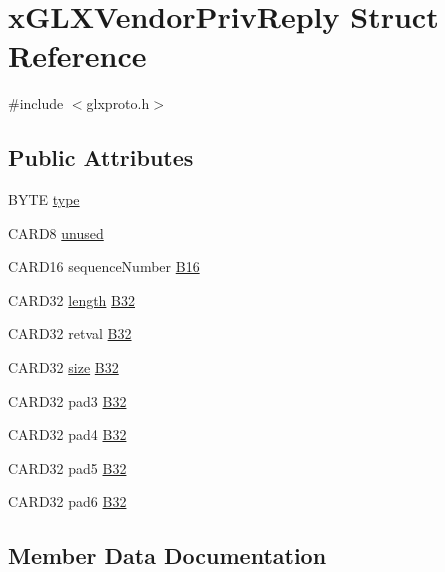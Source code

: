 \hypertarget{structx_g_l_x_vendor_priv_reply}{}\section{x\+G\+L\+X\+Vendor\+Priv\+Reply Struct Reference}
\label{structx_g_l_x_vendor_priv_reply}


{\ttfamily \#include $<$glxproto.\+h$>$}

\subsection*{Public Attributes}
\begin{DoxyCompactItemize}
\item 
B\+Y\+TE \hyperlink{structx_g_l_x_vendor_priv_reply_af3df38092168fb9cd123a3a0883542de}{type}
\item 
C\+A\+R\+D8 \hyperlink{structx_g_l_x_vendor_priv_reply_a4468f56526b1bedad190f80fa72fc6f1}{unused}
\item 
C\+A\+R\+D16 sequence\+Number \hyperlink{structx_g_l_x_vendor_priv_reply_a5fc7bec256c07611c224d598605bf4f3}{B16}
\item 
C\+A\+R\+D32 \hyperlink{glcorearb_8h_ab9c919755bde3b34349e23a32b4e0fa7}{length} \hyperlink{structx_g_l_x_vendor_priv_reply_a63693b8e48262a1a02ecc3f6144dafd5}{B32}
\item 
C\+A\+R\+D32 retval \hyperlink{structx_g_l_x_vendor_priv_reply_a4df138fd6872a389c2b5ca5fb4c7a225}{B32}
\item 
C\+A\+R\+D32 \hyperlink{glcorearb_8h_a3d1e3edfcf61ca2d831883e1afbad89e}{size} \hyperlink{structx_g_l_x_vendor_priv_reply_a77ef26ff1f14695e899ef8599446c1f0}{B32}
\item 
C\+A\+R\+D32 pad3 \hyperlink{structx_g_l_x_vendor_priv_reply_a60ab514521ae64d9734de532e1265b7c}{B32}
\item 
C\+A\+R\+D32 pad4 \hyperlink{structx_g_l_x_vendor_priv_reply_abedc3aaa0ee5b4af37564a1a22cd0f5c}{B32}
\item 
C\+A\+R\+D32 pad5 \hyperlink{structx_g_l_x_vendor_priv_reply_af508fbd692b9338607c3ce630490178a}{B32}
\item 
C\+A\+R\+D32 pad6 \hyperlink{structx_g_l_x_vendor_priv_reply_affaba969a28ea0f91908f6033957e108}{B32}
\end{DoxyCompactItemize}


\subsection{Member Data Documentation}
\mbox{\label{structx_g_l_x_vendor_priv_reply_a5fc7bec256c07611c224d598605bf4f3}} 
